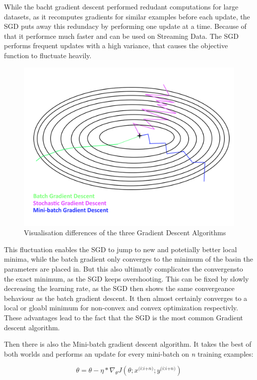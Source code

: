 \documentclass[12pt,oneside,a4paper,parskip]{scrbook}
\begin{document}
While the bacht gradient descent performed redudant computations for large datasets, as it recomputes gradients for similar examples 
before each update, the SGD puts away this redundacy by performing one update at a time. Because of that it performce much faster and 
can be used on Streaming Data.
The SGD performs frequent updates with a high variance, that causes the objective function to fluctuate heavily. 

\begin{figure}
  \centering
  \includegraphics[width=0.7\columnwidth]{Gradient_desc_types}
  \caption{Visualisation differences of the three Gradient Descent Algorithms}
  \label{fig:comp_GD}
\end{figure}

This fluctuation enables the SGD to jump to new and potetially better local minima, while the batch gradient only converges 
to the minimum of the basin the parameters are placed in. But this also ultimatly complicates the convergensto the exact minimum, 
as the SGD keeps overshooting. This can be fixed by slowly decreasing the learning rate, as the SGD then shows the same 
convergeance behaviour as the batch gradient descent. It then almost certainly converges to a local or gloabl minimum for
non-convex and convex optimization respectivly. \cite{overvieDiffRSLVQ}
These advantages lead to the fact that the SGD is the most common Gradient descent algorithm.

Then there is also the Mini-batch gradient descent algorithm. It takes the best of both worlds and performs an update for
every mini-batch on \textit{n} training examples:

\begin{equation}
\theta = \theta - \eta * \nabla_\theta \textit{J}(\theta;\textit{x}^\textit{(i:i+n)};\textit{y}^\textit{(i:i+n)})
\end{equation}
\end{document}
